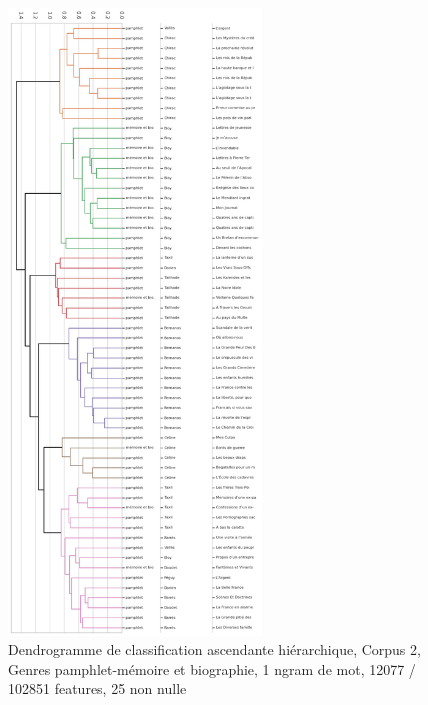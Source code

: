 \begin{figure}[H]
\centering %
\includegraphics[width=0.60\textwidth]{img/dendogram-corpus-2-PamMem.png }
\caption{Dendrogramme de classification ascendante hiérarchique, Corpus 2, Genres pamphlet-mémoire et biographie, 1 ngram de mot, 12077 / 102851 features, 25 non nulle}
\label{'fig:dendogram-corpus-2-PamMem'}
\end{figure}

